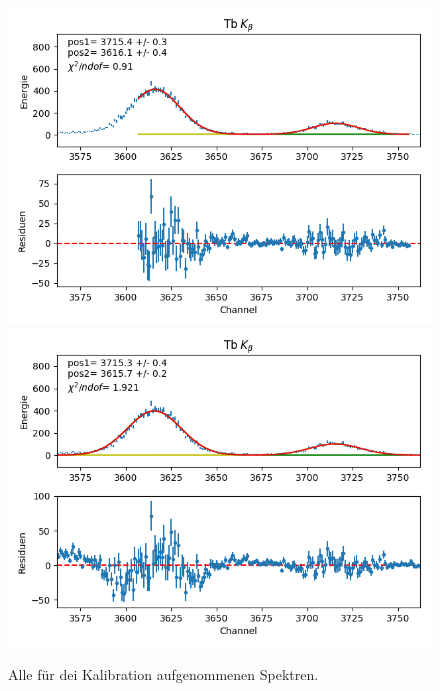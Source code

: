 \documentclass[12pt,a4paper]{article}
\begin{document}
\begin{figure}[H]
\centering
\includegraphics[scale=0.8]{Bilder/alpha/tb_beta_1.png}
\includegraphics[scale=0.8]{Bilder/alpha/tb_beta_2.png}
\caption{Alle für dei Kalibration aufgenommenen Spektren.}
\label{fig:kal_alles}
\end{figure}
\end{document}
